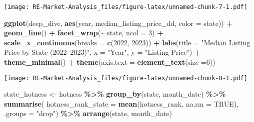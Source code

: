 \documentclass[
]{article}
\newenvironment{Shaded}{\begin{snugshade}}{\end{snugshade}}
\newcommand{\AttributeTok}[1]{\textcolor[rgb]{0.13,0.29,0.53}{#1}}
\newcommand{\ConstantTok}[1]{\textcolor[rgb]{0.56,0.35,0.01}{#1}}
\newcommand{\DecValTok}[1]{\textcolor[rgb]{0.00,0.00,0.81}{#1}}
\newcommand{\FunctionTok}[1]{\textcolor[rgb]{0.13,0.29,0.53}{\textbf{#1}}}
\newcommand{\NormalTok}[1]{#1}
\newcommand{\OtherTok}[1]{\textcolor[rgb]{0.56,0.35,0.01}{#1}}
\newcommand{\SpecialCharTok}[1]{\textcolor[rgb]{0.81,0.36,0.00}{\textbf{#1}}}
\newcommand{\StringTok}[1]{\textcolor[rgb]{0.31,0.60,0.02}{#1}}
\begin{document}
\texttt{[image: RE-Market-Analysis\_files/figure-latex/unnamed-chunk-7-1.pdf]}

\begin{Shaded}
\begin{Highlighting}[]
\FunctionTok{ggplot}\NormalTok{(deep\_dive, }\FunctionTok{aes}\NormalTok{(year, median\_listing\_price\_dd, }\AttributeTok{color =}\NormalTok{ state)) }\SpecialCharTok{+}
  \FunctionTok{geom\_line}\NormalTok{() }\SpecialCharTok{+}
  \FunctionTok{facet\_wrap}\NormalTok{(}\SpecialCharTok{\textasciitilde{}}\NormalTok{ state, }\AttributeTok{ncol =} \DecValTok{3}\NormalTok{) }\SpecialCharTok{+}
  \FunctionTok{scale\_x\_continuous}\NormalTok{(}\AttributeTok{breaks =} \FunctionTok{c}\NormalTok{(}\DecValTok{2022}\NormalTok{, }\DecValTok{2023}\NormalTok{)) }\SpecialCharTok{+}
  \FunctionTok{labs}\NormalTok{(}\AttributeTok{title =} \StringTok{"Median Listing Price by State (2022–2023)"}\NormalTok{,}
       \AttributeTok{x =} \StringTok{"Year"}\NormalTok{, }\AttributeTok{y =} \StringTok{"Listing Price"}\NormalTok{) }\SpecialCharTok{+}
  \FunctionTok{theme\_minimal}\NormalTok{() }\SpecialCharTok{+}
  \FunctionTok{theme}\NormalTok{(}\AttributeTok{axis.text =} \FunctionTok{element\_text}\NormalTok{(}\AttributeTok{size =}\DecValTok{6}\NormalTok{))}
\end{Highlighting}
\end{Shaded}

\texttt{[image: RE-Market-Analysis\_files/figure-latex/unnamed-chunk-8-1.pdf]}

\begin{Shaded}
\begin{Highlighting}[]
\NormalTok{state\_hotness }\OtherTok{\textless{}{-}}\NormalTok{ hotness }\SpecialCharTok{\%\textgreater{}\%}
  \FunctionTok{group\_by}\NormalTok{(state, month\_date) }\SpecialCharTok{\%\textgreater{}\%}
  \FunctionTok{summarise}\NormalTok{(}
    \AttributeTok{hotness\_rank\_state =} \FunctionTok{mean}\NormalTok{(hotness\_rank, }\AttributeTok{na.rm =} \ConstantTok{TRUE}\NormalTok{), }
    \AttributeTok{.groups =} \StringTok{"drop"}\NormalTok{) }\SpecialCharTok{\%\textgreater{}\%}
  \FunctionTok{arrange}\NormalTok{(state, month\_date)}
\end{Highlighting}
\end{Shaded}
\end{document}
